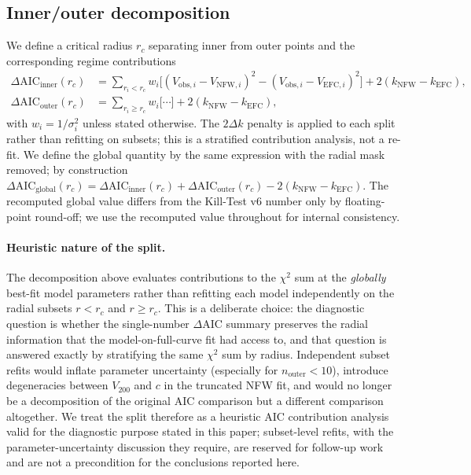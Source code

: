 \documentclass[11pt,a4paper]{article}
\begin{document}
\subsection{Inner/outer decomposition}
\label{sec:decomp}

We define a critical radius $r_c$ separating inner from outer points and
the corresponding regime contributions
\begin{align}
  \Delta\text{AIC}_{\text{inner}}(r_c) &=
    \sum_{r_i<r_c} w_i\bigl[(V_{\text{obs},i}-V_{\text{NFW},i})^2 -
                              (V_{\text{obs},i}-V_{\text{EFC},i})^2\bigr]
    + 2(k_{\text{NFW}}-k_{\text{EFC}}), \\
  \Delta\text{AIC}_{\text{outer}}(r_c) &=
    \sum_{r_i\ge r_c} w_i\bigl[\cdots\bigr] + 2(k_{\text{NFW}}-k_{\text{EFC}}),
\end{align}
with $w_i=1/\sigma_i^2$ unless stated otherwise.  The $2\Delta k$ penalty
is applied to each split rather than refitting on subsets; this is a
stratified contribution analysis, not a re-fit.  We define the global
quantity by the same expression with the radial mask removed; by
construction
$\Delta\text{AIC}_{\text{global}}(r_c) = \Delta\text{AIC}_{\text{inner}}(r_c)
                                          + \Delta\text{AIC}_{\text{outer}}(r_c)
                                          - 2(k_{\text{NFW}}-k_{\text{EFC}})$.
The recomputed global value differs from the Kill-Test v6 number only by
floating-point round-off; we use the recomputed value throughout for
internal consistency.

\paragraph{Heuristic nature of the split.}
The decomposition above evaluates contributions to the $\chi^2$ sum at
the {\em globally} best-fit model parameters rather than refitting each
model independently on the radial subsets $r<r_c$ and $r\ge r_c$.  This
is a deliberate choice: the diagnostic question is whether the
single-number $\Delta$AIC summary preserves the radial information that
the model-on-full-curve fit had access to, and that question is answered
exactly by stratifying the same $\chi^2$ sum by radius.  Independent
subset refits would inflate parameter uncertainty (especially for $n_{\text{outer}}<10$),
introduce degeneracies between $V_{200}$ and $c$ in the truncated NFW
fit, and would no longer be a decomposition of the original AIC
comparison but a different comparison altogether.  We treat the split
therefore as a heuristic AIC contribution analysis valid for the
diagnostic purpose stated in this paper; subset-level refits, with the
parameter-uncertainty discussion they require, are reserved for
follow-up work and are not a precondition for the conclusions reported
here.
\end{document}
